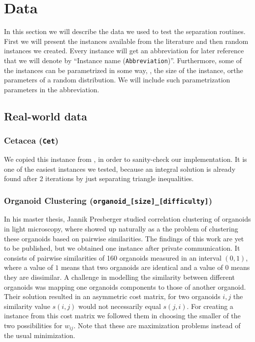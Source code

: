 \section{Data}\label{sec:data}
In this section we will describe the data we used to test the separation routines.
First we will present the instances available from the literature and then random instances we created.
Every instance will get an abbreviation for later reference that we will denote by “Instance name (\texttt{Abbreviation})”.
Furthermore, some of the instances can be parametrized in some way, \eg, the size of the instance, orthe parameters of a random distribution.
We will include such parametrization parameters in the abbreviation.

\subsection{Real-world data}
\subsubsection{Cetacea (\texttt{Cet})}\label{subsubsec:data_cetacea}
We copied this instance from \cite{grotschelCuttingPlaneAlgorithm1989}, in order to sanity-check our implementation.
It is one of the easiest instances we tested, because an integral solution is already found after 2 iterations by just separating triangle inequalities.

\subsubsection{Organoid Clustering (\texttt{organoid\_[size]\_[difficulty]})}
In his master thesis, Jannik Presberger studied correlation clustering of organoids in light microscopy, where \CP showed up naturally as a the problem of clustering these organoids based on pairwise similarities.
The findings of this work are yet to be published, but we obtained one instance after private communication.
It consists of pairwise similarities of 160 organoids measured in an interval $(0,1)$, where a value of $1$ means that two organoids are identical and a value of $0$ means they are dissimilar.
A challenge in modelling the similarity between different organoids was mapping one organoids components to those of another organoid.
Their solution resulted in an asymmetric cost matrix, \ie for two organoids $i, j$ the similarity value $s(i,j)$ would not necessarily equal $s(j,i)$.
For creating a \CP instance from this cost matrix we followed them in choosing the smaller of the two possibilities for $w_{ij}$.
Note that these are maximization problems instead of the usual minimization.

